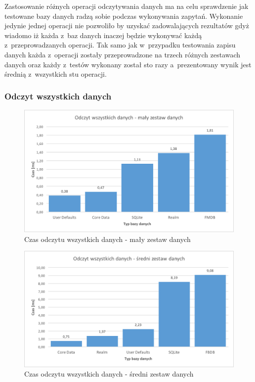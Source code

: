 Zastosowanie różnych operacji odczytywania danych ma na celu sprawdzenie jak testowane bazy danych radzą sobie podczas wykonywania zapytań. Wykonanie jedynie jednej operacji nie pozwoliło by uzyskać zadowalających rezultatów gdyż wiadomo iż każda z~baz danych inaczej będzie wykonywać każdą z~przeprowadzanych operacji. Tak samo jak w~przypadku testowania zapisu danych każda z~operacji zostały przeprowadzone na trzech różnych zestawach danych oraz każdy z~testów wykonany został sto razy a~prezentowany wynik jest średnią z~wszystkich stu operacji. 

\newpage

\subsubsection{Odczyt wszystkich danych}

\begin{figure}[h]
\centering
	\includegraphics[width=13.5cm]{img/read_data/read_all/read_all_test_small.png}
	\caption{Czas odczytu wszystkich danych - mały zestaw danych}
	\label{fig: read-data-small}
\end{figure}

\begin{figure}[h]
\centering
	\includegraphics[width=13.5cm]{img/read_data/read_all/read_all_test_medium.png}
	\caption{Czas odczytu wszystkich danych - średni zestaw danych}
	\label{fig: read-data-medium}
\end{figure}

